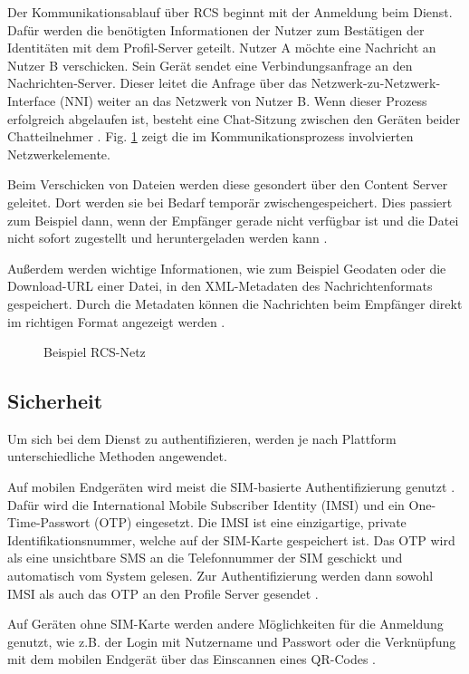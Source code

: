 \documentclass[conference]{IEEEtran}
\begin{document}
Der Kommunikationsablauf über RCS beginnt mit der Anmeldung beim Dienst.
Dafür werden die benötigten Informationen der Nutzer zum Bestätigen der Identitäten mit dem Profil-Server geteilt.
Nutzer A möchte eine Nachricht an Nutzer B verschicken.
Sein Gerät sendet eine Verbindungsanfrage an den Nachrichten-Server.
Dieser leitet die Anfrage über das Netzwerk-zu-Netzwerk-Interface (NNI) weiter an das Netzwerk von Nutzer B.
Wenn dieser Prozess erfolgreich abgelaufen ist, besteht eine Chat-Sitzung zwischen den Geräten beider Chatteilnehmer \cite{5gmsg}.
Fig. \ref{rcsnetz} zeigt die im Kommunikationsprozess involvierten Netzwerkelemente.

Beim Verschicken von Dateien werden diese gesondert über den Content Server geleitet.
Dort werden sie bei Bedarf temporär zwischengespeichert.
Dies passiert zum Beispiel dann, wenn der Empfänger gerade nicht verfügbar ist und die Datei nicht sofort zugestellt und heruntergeladen werden kann \cite{5gmsg}.

Außerdem werden wichtige Informationen, wie zum Beispiel Geodaten oder die Download-URL einer Datei, in den XML-Metadaten des Nachrichtenformats gespeichert.
Durch die Metadaten können die Nachrichten beim Empfänger direkt im richtigen Format angezeigt werden \cite{uncoversec}.

\begin{figure}
    \centerline{}
    \caption{Beispiel RCS-Netz \cite{5gmsg}}
    \label{rcsnetz}
\end{figure}

\subsection{Sicherheit}

Um sich bei dem Dienst zu authentifizieren, werden je nach Plattform unterschiedliche Methoden angewendet.

Auf mobilen Endgeräten wird meist die SIM-basierte Authentifizierung genutzt \cite{uniprof}.
Dafür wird die International Mobile Subscriber Identity (IMSI) und ein One-Time-Passwort (OTP) eingesetzt.
Die IMSI ist eine einzigartige, private Identifikationsnummer, welche auf der SIM-Karte gespeichert ist.
Das OTP wird als eine unsichtbare SMS an die Telefonnummer der SIM geschickt und automatisch vom System gelesen.
Zur Authentifizierung werden dann sowohl IMSI als auch das OTP an den Profile Server gesendet \cite{5gmsg}.

Auf Geräten ohne SIM-Karte werden andere Möglichkeiten für die Anmeldung genutzt, wie z.B. der Login mit Nutzername und Passwort oder die Verknüpfung mit dem mobilen Endgerät über das Einscannen eines QR-Codes \cite{uniprof}.
\end{document}
